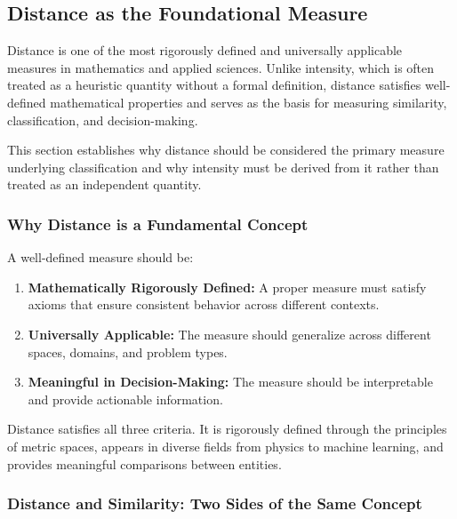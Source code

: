 \subsection{Distance as the Foundational Measure}

Distance is one of the most rigorously defined and universally applicable measures in mathematics and applied sciences. Unlike intensity, which is often treated as a heuristic quantity without a formal definition, distance satisfies well-defined mathematical properties and serves as the basis for measuring similarity, classification, and decision-making.

This section establishes why distance should be considered the primary measure underlying classification and why intensity must be derived from it rather than treated as an independent quantity.

\subsubsection{Why Distance is a Fundamental Concept}

A well-defined measure should be:

\begin{enumerate}
    \item \textbf{Mathematically Rigorously Defined:} A proper measure must satisfy axioms that ensure consistent behavior across different contexts.
    \item \textbf{Universally Applicable:} The measure should generalize across different spaces, domains, and problem types.
    \item \textbf{Meaningful in Decision-Making:} The measure should be interpretable and provide actionable information.
\end{enumerate}

Distance satisfies all three criteria. It is rigorously defined through the principles of metric spaces, appears in diverse fields from physics to machine learning, and provides meaningful comparisons between entities.


\subsubsection{Distance and Similarity: Two Sides of the Same Concept}

